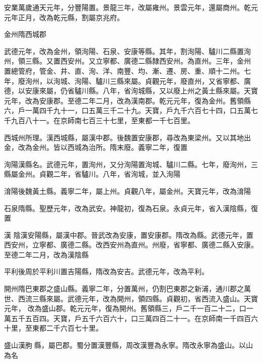 \begin{pinyinscope}
 安業萬歲通天元年，分豐陽置。景龍三年，改屬雍州。景雲元年，還屬商州。乾元元年正月，改為乾元縣，割屬京兆府。



 金州隋西城郡



 武德元年，改為金州，領洵陽、石泉、安康等縣。其年，割洵陽、驢川二縣置洵州，領三縣。又置西安州。又立寧都、廣德二縣隸西安州。為直州。三年，金州
 置總管府，管金、井、直、洵、洋、南豐、均、漸、遷、房、重、順十二州。七年，廢洵州，以洵城、洵陽、驢川三縣來屬。貞觀元年，廢直州，又省寧都、廣德，以安康來屬，仍省驢川縣。八年，省洵城縣，又以廢上州之黃土縣來屬。天寶元年，改為安康郡。至德二年二月，改為漢南郡。乾元元年，復為金州。舊領縣六，戶一萬四千九十一，口五萬三千二十九。天寶，戶九千六百七十四，口五萬七千九百八十一。在京師南七百三十七里，至東都一千七百里。



 西城州所理。漢西城縣，屬漢中郡。後魏置安康郡，尋改為東梁州。又以其地出金，改為金州。皆以西城為治所。隋末廢。義寧二年，復置



 洵陽漢縣名。武德元年，置洵州，又分洵陽置洵城、驢川二縣。七年，廢洵州，三縣屬金州。貞觀二年，省驢川。八年，省洵城，並入洵陽



 淯陽後魏黃土縣。義寧二年，屬上州。貞觀八年，屬金州。天寶元年，改為淯陽



 石泉隋縣。聖歷元年，改為武安。神龍初，復為石泉。永貞元年，省入漢陰縣，復置



 漢
 陰漢安陽縣，屬漢中郡。晉武改為安康，置安康郡。隋改為縣。武德元年，置西安州，立寧都、廣德二縣。改西安州為直州。州廢，省寧都、廣德二縣入安康。至德二年二月，改為漢陰縣



 平利後周於平利川置吉陽縣，隋改為安吉。武德元年，改為平利。



 開州隋巴東郡之盛山縣。義寧二年，分置萬州，仍割巴東郡之新浦，通川郡之萬世、西流三縣來屬。武德元年，改為開州，領四縣。貞觀初，省西流入盛山。天寶元年，
 改為盛山郡。乾元元年，復為開州。舊領縣三，戶二千一百二十二，口一萬五千五百四。天寶，戶五千六百六十，口三萬四百二十一。在京師南一千四百六十里，至東都二千六百七十里。



 盛山漢朐縣，屬巴郡。蜀分置漢豐縣，周改漢豐為永寧。隋改永寧為盛山。以山為名




\end{pinyinscope}

